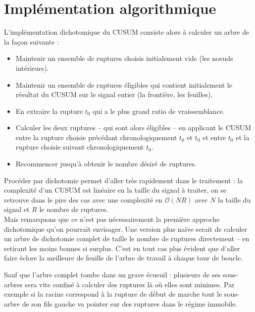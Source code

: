 \documentclass[french,11pt,notitlepage]{report}
\begin{document}
	\section{Implémentation algorithmique}

	L'implémentation dichotomique du CUSUM consiste alors à calculer un arbre de la façon suivante :
	\\
	\begin{itemize}
	\item Maintenir un ensemble de ruptures choisis initialement vide (les noeuds intérieurs).
	\item Maintenir un ensemble de ruptures éligibles qui contient initialement le résultat du CUSUM sur le signal entier (la frontière, les feuilles).
	\item En extraire la rupture $t_0$ qui a le plus grand ratio de vraissemblance.
	\item Calculer les deux ruptures -- qui sont alors éligibles -- en applicant le CUSUM entre la rupture choisie précédant chronologiquement $t_0$ et $t_0$ et entre $t_0$ et la rupture choisie suivant chronologiquement $t_0$.
	\item Recommencer jusqu'à obtenir le nombre désiré de ruptures.\\
	\end{itemize}
	
	
	Procéder par dichotomie permet d'aller très rapidement dans le traitement : la complexité d'un CUSUM est linéaire en la taille du signal à traiter, on se retrouve dans le pire des cas avec une complexité en $\mathcal O(NR)$ avec $N$ la taille du signal et $R$ le nombre de ruptures.
	\\
	
	Mais remarquons que ce n'est pas nécessairement la première approche dichotomique qu'on pourrait envisager.
	Une version plus naïve serait de calculer un arbre de dichotomie complet de taille le nombre de ruptures directement -- en retirant les moins bonnes si surplus.
	C'est en tout cas plus évident que d'aller faire éclore la meilleure de feuille de l'arbre de travail à chaque tour de boucle.
	
	Sauf que l'arbre complet tombe dans un grave écueuil : plusieurs de ses sous-arbres sera vite confiné à calculer des ruptures là où elles sont minimes.
	Par exemple si la racine correspond à la rupture de début de marche tout le sous-arbre de son fils gauche va pointer sur des ruptures dans le régime immobile.
	\\
	
\end{document}
